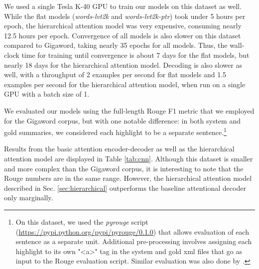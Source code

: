  We used a single Tesla K-40 GPU to train our models on this dataset as well. While the flat models ({\it words-lvt2k} and {\it words-lvt2k-ptr}) took under 5 hours per epoch, the hierarchical attention model was very expensive, consuming nearly 12.5 hours per epoch. %
Convergence of all models is also slower on this dataset compared to Gigaword, taking nearly 35 epochs for all models. Thus, the wall-clock time for training until convergence is about 7 days for the flat models, but nearly 18 days for the hierarchical attention model. Decoding is also slower as well, with a throughput of 2 examples per second for flat models and 1.5 examples per second for the hierarchical attention model, when run on a single GPU with a batch size of 1.

 We evaluated our models using the full-length Rouge F1 metric that we employed for the Gigaword corpus, but with one notable difference: in both system and gold summaries, we considered each highlight to be a separate sentence.\footnote{On this dataset, we used the {\it pyrouge} script (\url{https://pypi.python.org/pypi/pyrouge/0.1.0}) that allows evaluation of each sentence as a separate unit. Additional pre-processing involves assigning each highlight to its own "<a>" tag in the system and gold xml files that go as input to the Rouge evaluation script. Similar evaluation was also done by \cite{jianpeng}.}

 Results from the basic attention encoder-decoder as well as the hierarchical attention model are displayed in Table \ref{tab:cnn}. Although this dataset is smaller and more complex than the Gigaword corpus, it is interesting to note that the Rouge numbers are in the same range. However, the hierarchical attention model described in Sec. \ref{sec:hierarchical} outperforms  the baseline attentional decoder only marginally. 

